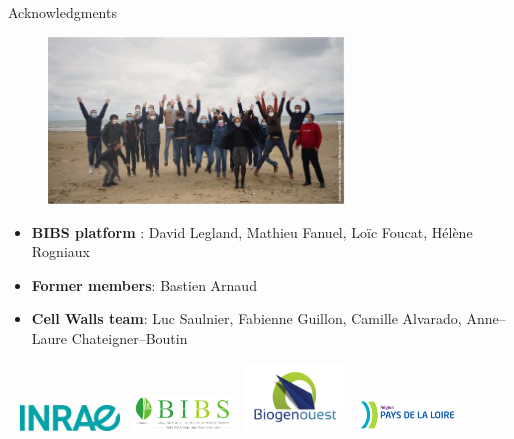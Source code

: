 \documentclass[10pt]{beamer}
\begin{document}
\section{}
\begin{frame}[plain]{Acknowledgments}
  \begin{figure}[ht]
      \centering
      \includegraphics[width=0.7\textwidth]{fig/photoequipe}
    \end{figure}
    
    {\scriptsize
  \begin{itemize}
  \item \textbf{BIBS platform} : David Legland, Mathieu Fanuel, Loïc Foucat, Hélène Rogniaux
  \item \textbf{Former members}: Bastien Arnaud
  \item \textbf{Cell Walls team}: Luc Saulnier, Fabienne Guillon, Camille Alvarado, Anne--Laure Chateigner--Boutin
  \end{itemize}
}
\vspace{-0.5cm}
  \hspace*{0.01\textwidth}~%
  \includegraphics[width=0.2\textwidth]{fig/logo-inrae}\hspace*{0.075\textwidth}~%
  \includegraphics[width=0.2\textwidth]{fig/logo-bibs.png}\hspace*{0.075\textwidth}~%
  \includegraphics[width=0.2\textwidth]{fig/logo-biogenouest}\hspace*{0.075\textwidth}~%
  \includegraphics[width=0.2\textwidth]{fig/logo-region}\hspace*{0.01\textwidth}~%

\end{frame}
\end{document}
